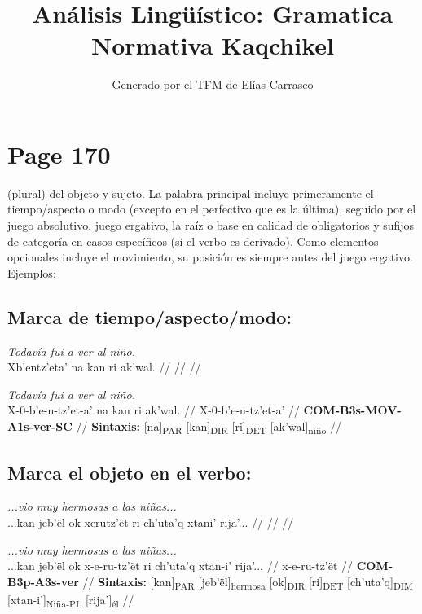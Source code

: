 \documentclass{article}%
\title{Análisis Lingüístico: Gramatica Normativa Kaqchikel}%
\author{Generado por el TFM de Elías Carrasco}%
\begin{document}
%
\normalsize%
\maketitle%
\section{Page 170}%
\label{sec:Page170}%
(plural) del objeto y sujeto. La palabra principal incluye primeramente el tiempo/aspecto %
o modo (excepto en el perfectivo que es la última), seguido por el juego absolutivo, %
juego ergativo, la raíz o base en calidad de obligatorios y sufijos de categoría en casos %
específicos (si el verbo es derivado). Como elementos opcionales incluye el movimiento, %
su posición es siempre antes del juego ergativo. Ejemplos: %
\subsection{Marca de tiempo/aspecto/modo:}%
\label{subsec:Marcadetiempo/aspecto/modo}%

%
\par\medskip%
\ex
\textit{Todavía fui a ver al niño.} \\
\begingl
\gla Xb'entz'eta' na kan ri ak'wal. //
\glb  //
\glc  //
\endgl
\xe
%
\medskip%
\par\medskip%
\ex
\textit{Todavía fui a ver al niño.} \\
\begingl
\gla X-0-b'e-n-tz'et-a' na kan ri ak'wal. //
\glb X-0-b'e-n-tz'et-a' //
\glc \textbf{COM-}\textbf{B3s-}\textbf{MOV-}\textbf{A1s-}\textbf{ver-}\textbf{SC} //
\glft \textbf{Sintaxis:} [na]\textsubscript{PAR} [kan]\textsubscript{DIR} [ri]\textsubscript{DET} [ak'wal]\textsubscript{niño} //
\endgl
\xe
%
\medskip%
\subsection{Marca el objeto en el verbo:}%
\label{subsec:Marcaelobjetoenelverbo}%

%
\par\medskip%
\ex
\textit{...vio muy hermosas a las niñas...} \\
\begingl
\gla ...kan jeb'ël ok xerutz'ët ri ch'uta'q xtani' rija'... //
\glb  //
\glc  //
\endgl
\xe
%
\medskip%
\par\medskip%
\ex
\textit{...vio muy hermosas a las niñas...} \\
\begingl
\gla ...kan jeb'ël ok x-e-ru-tz'ët ri ch'uta'q xtan-i' rija'... //
\glb x-e-ru-tz'ët //
\glc \textbf{COM-}\textbf{B3p-}\textbf{A3s-}\textbf{ver} //
\glft \textbf{Sintaxis:} [kan]\textsubscript{PAR} [jeb'ël]\textsubscript{hermosa} [ok]\textsubscript{DIR} [ri]\textsubscript{DET} [ch'uta'q]\textsubscript{DIM} [xtan-i']\textsubscript{Niña-PL} [rija']\textsubscript{él} //
\endgl
\xe
%
\medskip%
\end{document}
